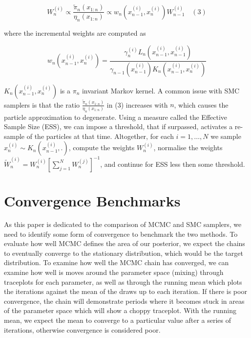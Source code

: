 \documentclass[12pt]{elsarticle}
\begin{document}
\[
W_n^{(i)} \propto \frac{\tilde{\pi}_n(x_{1:n})}{\eta_n(x_{1:n})} \propto w_n(x_{n-1}^{(i)}, x_n^{(i)})W_{n-1}^{(i)} \quad (3)
\]

where the incremental weights are computed as

\[
w_n(x_{n-1}^{(i)}, x_n^{(i)}) = \frac{\gamma_n^{(i)}L_{n}(x_{n-1}^{(i)}, x_{n-1}^{(i)})}{\gamma_{n-1}(x_{n-1}^{(i)}) K_n(x_{n-1}^{(i)}, x_n^{(i)})}
\]

$K_n(x_{n-1}^{(i)}, x_n^{(i)})$ is a $\pi_n$ invariant Markov kernel. A common issue with SMC samplers is that the ratio $\frac{\tilde{\pi}_n(x_{1:n})}{\eta_n(x_{1:n})}$ in (3) increases with $n$, which causes the particle approximation to degenerate. Using a measure called the Effective Sample Size (ESS), we can impose a threshold, that if surpassed, activates a re-sample of the particles at that time. Altogether, for each $i = 1, \dots, N$ we sample $x_n^{(i)} \sim K_n(x_{n-1}^{(i)}, .)$, compute the weights $W_n^{(i)}$, normalise the weights $\tilde{W}_n^{(i)} = W_n^{(i)}[\sum_{j=1}^N W_n^{(j)}]^{-1}$, and continue for ESS less then some threshold.

\section*{Convergence Benchmarks}
As this paper is dedicated to the comparison of MCMC and SMC samplers, we need to identify some form of convergence to benchmark the two methods. To evaluate how well MCMC defines the area of our posterior, we expect the chains to eventually converge to the stationary distribution, which would be the target distribution. To examine how well the MCMC chain has converged, we can examine how well is moves around the parameter space (mixing) through traceplots for each parameter, as well as through the running mean which plots the iterations against the mean of the draws up to each iteration. If there is poor convergence, the chain will demonstrate periods where it becomes stuck in areas of the parameter space which will show a choppy traceplot. With the running mean, we expect the mean to converge to a particular value after a series of iterations, otherwise convergence is considered poor.














\end{document}
